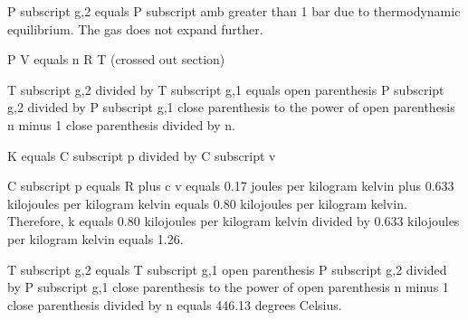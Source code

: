 P subscript g,2 equals P subscript amb greater than 1 bar due to thermodynamic equilibrium. The gas does not expand further.

P V equals n R T (crossed out section)

T subscript g,2 divided by T subscript g,1 equals open parenthesis P subscript g,2 divided by P subscript g,1 close parenthesis to the power of open parenthesis n minus 1 close parenthesis divided by n.

K equals C subscript p divided by C subscript v

C subscript p equals R plus c v equals 0.17 joules per kilogram kelvin plus 0.633 kilojoules per kilogram kelvin equals 0.80 kilojoules per kilogram kelvin. Therefore, k equals 0.80 kilojoules per kilogram kelvin divided by 0.633 kilojoules per kilogram kelvin equals 1.26.

T subscript g,2 equals T subscript g,1 open parenthesis P subscript g,2 divided by P subscript g,1 close parenthesis to the power of open parenthesis n minus 1 close parenthesis divided by n equals 446.13 degrees Celsius.